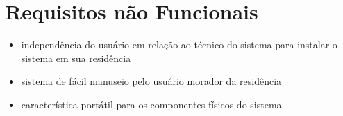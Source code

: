 \section{Requisitos não Funcionais}

\begin{itemize}
	\item{independência do usuário em relação ao técnico do sistema para instalar o sistema em sua residência}
	\item{sistema de fácil manuseio pelo usuário morador da residência}
	\item{característica portátil para os componentes físicos do sistema}
\end{itemize}




